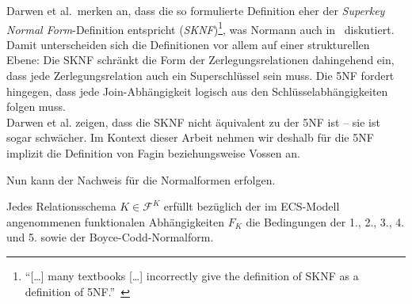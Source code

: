 \begin{tcolorbox}[excursusbox, title={Definition der 5. Normalform in der Literatur}]
    Darwen et al.\ merken an, dass die so formulierte Definition eher der \textit{Superkey Normal Form}-Definition entspricht (\textit{SKNF})\footnote{
        ``[\ldots] many textbooks [\ldots] incorrectly give the deﬁnition of SKNF as a deﬁnition of 5NF.''~\cite{Dar12}
    }, was Normann auch in~\cite{Nor98} diskutiert.\\

    Damit unterscheiden sich die Definitionen vor allem auf einer strukturellen Ebene: Die SKNF schränkt die Form der Zerlegungsrelationen dahingehend ein, dass jede Zerlegungsrelation auch ein Superschlüssel sein muss. Die 5NF fordert hingegen, dass jede Join-Abhängigkeit logisch aus den Schlüsselabhängigkeiten folgen muss.\\

    Darwen et al. zeigen, dass die SKNF nicht äquivalent zu der 5NF ist -- sie ist sogar schwächer.
    Im Kontext dieser Arbeit nehmen wir deshalb für die 5NF implizit die Definition von Fagin beziehungsweise Vossen an.
\end{tcolorbox}
\bigskip


Nun kann der Nachweis für die Normalformen erfolgen.
\medskip



\begin{theorem}\label{f_min_norm}
    Jedes Relationsschema $K \in \mathcal{F}^K$ erfüllt bezüglich der im ECS-Modell angenommenen funktionalen Abhängigkeiten $F_K$ die Bedingungen der 1., 2., 3., 4. und 5. sowie der Boyce-Codd-Normalform.
\end{theorem}

